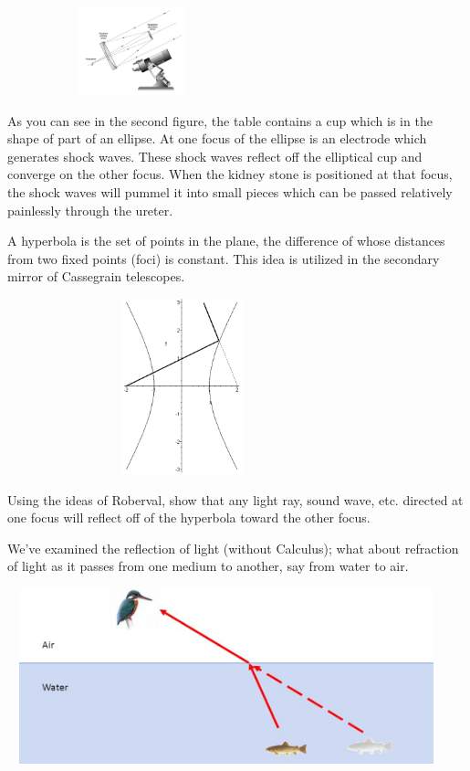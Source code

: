 \begin{figure}
\captionsetup{labelformat=empty}
\centerline{\includegraphics*[height=1in,width=2in]{Figures/CassegrainTelescope}}
\label{fig:}
\end{figure}
As you can see in the second figure, the table contains a cup which is
in the shape of part of an ellipse.  At one focus of the ellipse is an
electrode which generates shock waves.  These shock waves reflect off
the elliptical cup and converge on the other focus.  When the kidney
stone is positioned at that focus, the shock waves will pummel it into
small pieces which can be passed relatively painlessly through the
ureter. 


A hyperbola is the set of points in the plane, the difference of whose
distances from two fixed points (foci) is constant. This idea is
utilized in the secondary mirror of Cassegrain telescopes.

\begin{embeddedproblem}{}
\centerline{\includegraphics*[height=2in,width=4in]{Figures/Hyperbola1}}

Using the ideas of Roberval, show that any light ray, sound wave, etc. directed at one focus will reflect off of the hyperbola toward the other focus.
\end{embeddedproblem}

We've examined the reflection of light (without Calculus); what about
refraction of light as it passes from one medium to another, say from
water to air.

\centerline{\includegraphics*[height=2in,width=5in]{Figures/Refraction1}}

